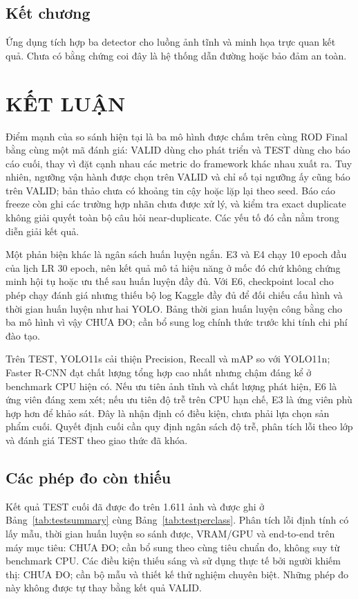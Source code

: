 \documentclass[12pt,a4paper,oneside]{report}
\begin{document}
\section{Kết chương}
Ứng dụng tích hợp ba detector cho luồng ảnh tĩnh và minh họa trực quan kết quả. Chưa có bằng chứng coi đây là hệ thống dẫn đường hoặc bảo đảm an toàn.
\chapter*{KẾT LUẬN}
Điểm mạnh của so sánh hiện tại là ba mô hình được chấm trên cùng ROD Final bằng cùng một mã đánh giá: VALID dùng cho phát triển và TEST dùng cho báo cáo cuối, thay vì đặt cạnh nhau các metric do framework khác nhau xuất ra.  Tuy nhiên, ngưỡng vận hành được chọn trên VALID và chỉ số tại ngưỡng ấy cũng báo trên VALID; bản thảo chưa có khoảng tin cậy hoặc lặp lại theo seed. Báo cáo freeze còn ghi các trường hợp nhãn chưa được xử lý, và kiểm tra exact duplicate không giải quyết toàn bộ câu hỏi near-duplicate.  Các yếu tố đó cần nằm trong diễn giải kết quả.

Một phản biện khác là ngân sách huấn luyện ngắn. E3 và E4 chạy 10 epoch đầu của lịch LR 30 epoch, nên kết quả mô tả hiệu năng ở mốc đó chứ không chứng minh hội tụ hoặc ưu thế sau huấn luyện đầy đủ.  Với E6, checkpoint local cho phép chạy đánh giá nhưng thiếu bộ log Kaggle đầy đủ để đối chiếu cấu hình và thời gian huấn luyện như hai YOLO.  Bảng thời gian huấn luyện công bằng cho ba mô hình vì vậy CHƯA ĐO; cần bổ sung log chính thức trước khi tính chi phí đào tạo.

Trên TEST, YOLO11s cải thiện Precision, Recall và mAP so với YOLO11n; Faster R-CNN đạt chất lượng tổng hợp cao nhất nhưng chậm đáng kể ở benchmark CPU hiện có.  Nếu ưu tiên ảnh tĩnh và chất lượng phát hiện, E6 là ứng viên đáng xem xét; nếu ưu tiên độ trễ trên CPU hạn chế, E3 là ứng viên phù hợp hơn để khảo sát. Đây là nhận định có điều kiện, chưa phải lựa chọn sản phẩm cuối. Quyết định cuối cần quy định ngân sách độ trễ, phân tích lỗi theo lớp và đánh giá TEST theo giao thức đã khóa.

\section*{Các phép đo còn thiếu}
Kết quả TEST cuối đã được đo trên 1.611 ảnh và được ghi ở Bảng~\ref{tab:testsummary} cùng Bảng~\ref{tab:testperclass}. Phân tích lỗi định tính có lấy mẫu, thời gian huấn luyện so sánh được, VRAM/GPU và end-to-end trên máy mục tiêu: CHƯA ĐO; cần bổ sung theo cùng tiêu chuẩn đo, không suy từ benchmark CPU. Các điều kiện thiếu sáng và sử dụng thực tế bởi người khiếm thị: CHƯA ĐO; cần bộ mẫu và thiết kế thử nghiệm chuyên biệt. Những phép đo này không được tự thay bằng kết quả VALID.
\end{document}
